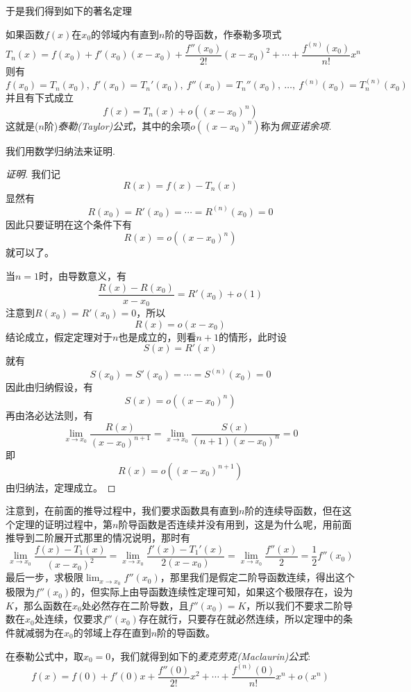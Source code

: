 于是我们得到如下的著名定理
\begin{theorem}[泰勒(Taylor)定理]
  如果函数$f(x)$在$x_0$的邻域内有直到$n$阶的导函数，作泰勒多项式
\[ T_n(x) = f(x_0) + f'(x_0)(x-x_0)+\frac{f''(x_0)}{2!}(x-x_0)^2+ \cdots +\frac{f^{(n)}(x_0)}{n!}x^n \]
则有
\[ f(x_0)=T_n(x_0), \ f'(x_0) = T_n'(x_0), \  f''(x_0) = T_n''(x_0), \ \ldots, \  f^{(n)}(x_0) = T_n^{(n)}(x_0) \]
并且有下式成立
\[ f(x) = T_n(x) + o((x-x_0)^n) \]
这就是($n$阶)\emph{泰勒(Taylor)公式}，其中的余项$o((x-x_0)^n)$称为\emph{佩亚诺余项}.
\end{theorem}

我们用数学归纳法来证明.
\begin{proof}[证明]
  我们记
  \[ R(x) = f(x) - T_n(x) \]
  显然有
  \[ R(x_0) = R'(x_0) = \cdots = R^{(n)}(x_0) = 0 \]
  因此只要证明在这个条件下有
  \[ R(x) = o((x-x_0)^n) \]
  就可以了。
  
  当$n=1$时，由导数意义，有
  \[ \frac{R(x)-R(x_0)}{x-x_0} = R'(x_0) + o(1) \]
  注意到$R(x_0)=R'(x_0)=0$，所以
  \[ R(x) =  o(x-x_0) \]
  结论成立，假定定理对于$n$也是成立的，则看$n+1$的情形，此时设
  \[ S(x) = R'(x) \]
  就有
  \[ S(x_0) = S'(x_0) = \cdots = S^{(n)}(x_0) = 0 \]
  因此由归纳假设，有
  \[ S(x) = o((x-x_0)^n) \]
  再由洛必达法则，有
  \[ \lim_{x \to x_0} \frac{R(x)}{(x-x_0)^{n+1}} = \lim_{x \to x_0} \frac{S(x)}{(n+1)(x-x_0)^n} = 0 \]
  即
  \[ R(x) = o((x-x_0)^{n+1}) \]
  由归纳法，定理成立。
\end{proof}

注意到，在前面的推导过程中，我们要求函数具有直到$n$阶的连续导函数，但在这个定理的证明过程中，第$n$阶导函数是否连续并没有用到，这是为什么呢，用前面推导到二阶展开式那里的情况说明，那时有
\[ \lim_{x \to x_0} \frac{f(x)-T_1(x)}{(x-x_0)^2} = \lim_{x \to x_0} \frac{f'(x)-T_1'(x)}{2(x-x_0)} = \lim_{x \to x_0} \frac{f''(x)}{2} = \frac{1}{2} f''(x_0) \]
最后一步，求极限$\lim_{x \to x_0} f''(x_0)$，那里我们是假定二阶导函数连续，得出这个极限为$f''(x_0)$的，但实际上由导函数连续性定理可知，如果这个极限存在，设为$K$，那么函数在$x_0$处必然存在二阶导数，且$f''(x_0)=K$，所以我们不要求二阶导数在$x_0$处连续，仅要求$f''(x_0)$存在就行，只要存在就必然连续，所以定理中的条件就减弱为在$x_0$的邻域上存在直到$n$阶的导函数。

在泰勒公式中，取$x_0 = 0$，我们就得到如下的\emph{麦克劳克(Maclaurin)公式}:
\[ f(x) = f(0) + f'(0)x + \frac{f''(0)}{2!}x^2 + \cdots + \frac{f^{(n)}(0)}{n!}x^n + o(x^n) \]

